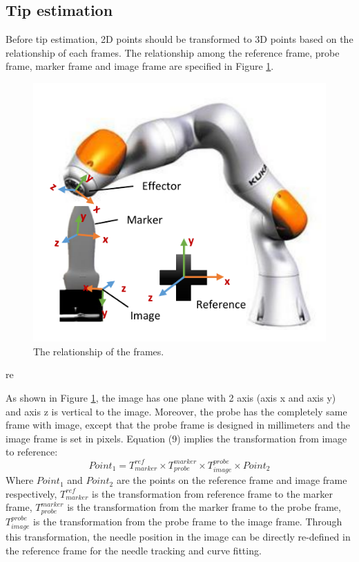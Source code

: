 \documentclass[journal,article,submit,moreauthors,pdftex]{Definitions/mdpi}
\begin{document}
\subsection{Tip estimation}
Before tip estimation, 2D points should be transformed to 3D points based on the relationship of each frames. The relationship among the reference frame, probe frame, marker frame and image frame are specified in Figure \ref{fig:5}.

\begin{figure}[H]
	\centering
	\includegraphics[width=8.2 cm]{figures/2/f5.pdf}
	\captionsetup{width=16 cm,justification=centering}
    \caption{The relationship of the frames.}
    \label{fig:5}
\end{figure}re

As shown in Figure \ref{fig:5}, the image has one plane with 2 axis (axis x and axis y) and axis z is vertical to the image. Moreover, the probe has the completely same frame with image, except that the probe frame is designed in millimeters and the image frame is set in pixels. Equation (9) implies the transformation from image to reference:
\begin{equation}
{Point}_1=T_{marker}^{ref}\times T_{probe}^{marker}\times T_{image}^{probe}\times {Point}_2
\end{equation}
Where ${{Point}_1}$ and ${{Point}_2}$ are the points on the reference frame and image frame respectively, ${T_{marker}^{ref}}$ is the transformation from reference frame to the marker frame, ${T_{probe}^{marker}}$ is the transformation from the marker frame to the probe frame, ${T_{image}^{probe}}$ is the transformation from the probe frame to the image frame. Through this transformation, the needle position in the image can be directly re-defined in the reference frame for the needle tracking and curve fitting.
\end{document}
